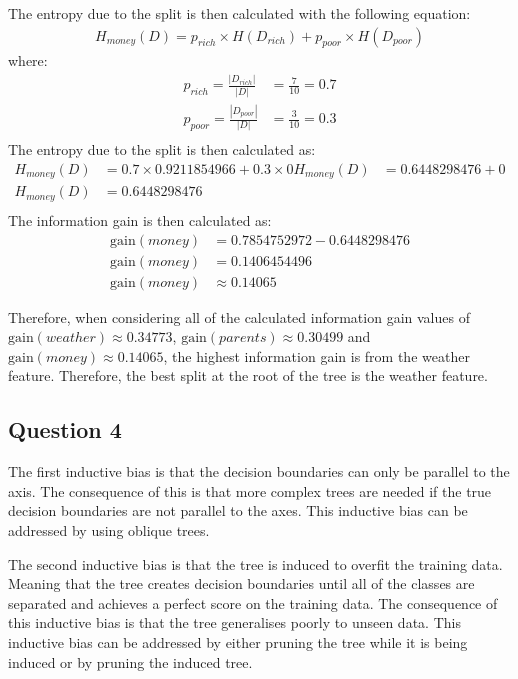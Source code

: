 \documentclass[10pt]{article}
\begin{document}
The entropy due to the split is then calculated with the following equation:
\begin{align*}
    H_{money}(D) = p_{rich} \times H(D_{rich}) + p_{poor} \times H(D_{poor})
\end{align*}
where:
\begin{align*}
    p_{rich} = \frac{|D_{rich}|}{|D|} &= \frac{7}{10} = 0.7\\
    p_{poor} = \frac{|D_{poor}|}{|D|} &= \frac{3}{10} = 0.3\\
\end{align*}
The entropy due to the split is then calculated as:
\begin{align*}
    H_{money}(D) &= 0.7 \times 0.9211854966 + 0.3 \times 0
    H_{money}(D) &= 0.6448298476 + 0 \\
    H_{money}(D) &= 0.6448298476 \\
\end{align*}
The information gain is then calculated as:
\begin{align*}
    \text{gain}(money) &= 0.7854752972 - 0.6448298476 \\
    \text{gain}(money) &= 0.1406454496 \\
    \text{gain}(money) &\approx 0.14065
\end{align*}

Therefore, when considering all of the calculated information gain values of
$\text{gain}(weather) \approx 0.34773$, $\text{gain}(parents) \approx 0.30499$
and $\text{gain}(money) \approx 0.14065$, the highest information gain is from the
weather feature. Therefore, the best split at the root of the tree is the weather feature.

\subsection*{Question 4}

The first inductive bias is that the decision boundaries can only be parallel to the axis. The
consequence of this is that more complex trees are needed if the true decision boundaries are not
parallel to the axes. This inductive bias can be addressed by using oblique trees.

The second inductive bias is that the tree is induced to overfit the training data. Meaning that
the tree creates decision boundaries until all of the classes are separated and achieves a
perfect score on the training data. The consequence of this inductive bias is that the
tree generalises poorly to unseen data. This inductive bias can be addressed by either pruning the
tree while it is being induced or by pruning the induced tree.
\end{document}
